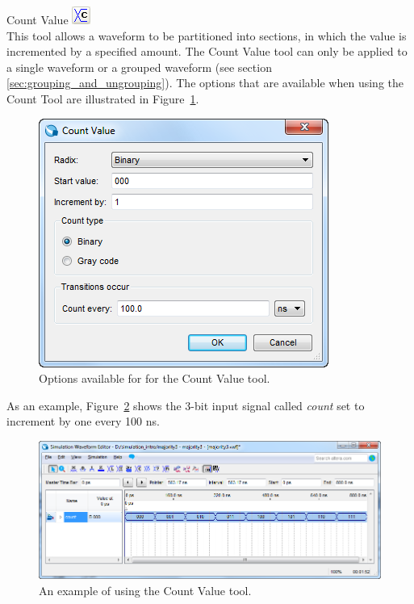 \documentclass[11pt, twoside, pdftex]{article}
\begin{document}
\begin{description}
	\item {\sf Count Value} \hbox{\includegraphics[scale=0.7]{figures/appendix/icon10.png}}\\
	This tool allows a waveform to be partitioned into sections, in which the value is incremented 
	by a specified amount. 
	The {\sf Count Value} tool can only be applied to a single waveform or a grouped waveform (see section \ref{sec:grouping_and_ungrouping}).
	The options that are available when using the {\sf Count Tool} are illustrated in Figure~\ref{fig:fig10}. 
	\begin{figure}[H]
	   \begin{center}
	      \includegraphics[scale=0.65]{figures/appendix/figure10.png}
	   \caption{Options available for for the {\sf Count Value} tool.} 
		 \label{fig:fig10}
		 \end{center}
	\end{figure}
	
	As an example, Figure~\ref{fig:fig11} shows the 3-bit input signal called {\it count} set to increment by one 
	every 100 ns. 
	\begin{figure}[H]
	   \begin{center}
	      \includegraphics[scale=0.65]{figures/appendix/figure11.png}
	   \caption{An example of using the {\sf Count Value} tool.} 
		 \label{fig:fig11}
		 \end{center}
	\end{figure}
	

\end{description}
\end{document}
